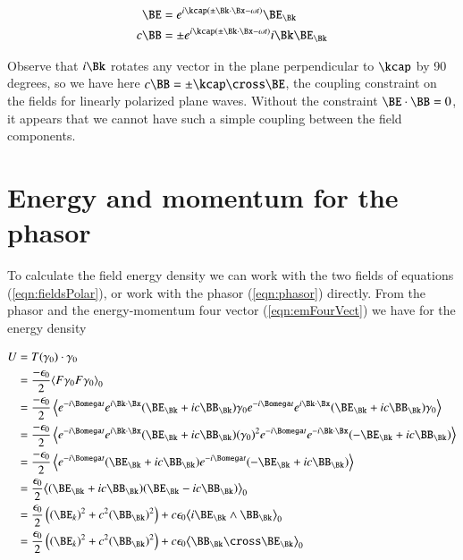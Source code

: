 \begin{align}
\BE &= e^{i \kcap( \pm \Bk \cdot \Bx -\omega t )} \BE_\Bk \\
c \BB &= \pm e^{i \kcap( \pm \Bk \cdot \Bx -\omega t )} i \Bk \BE_\Bk
\end{align}

Observe that $i\Bk$ rotates any vector in the plane perpendicular to $\kcap$ by 90 degrees, so we have here $c \BB = \pm \kcap \cross \BE$, the coupling constraint on the fields for linearly polarized plane waves.  Without the constraint $\BE \cdot \BB = 0$, it appears that we cannot have such a simple coupling between the field components.

\section{Energy and momentum for the phasor}

To calculate the field energy density we can work with the two fields of equations (\ref{eqn:fieldsPolar}), or work with the phasor (\ref{eqn:phasor}) directly.  From the phasor and the energy-momentum four vector (\ref{eqn:emFourVect}) we have for the energy density 

\begin{align*}
U &= T(\gamma_0) \cdot \gamma_0 \\
&= \frac{-\epsilon_0}{2}\gpgradezero{ F \gamma_0 F \gamma_0 } \\
&= \frac{-\epsilon_0}{2}
\left\langle{
e^{-i\Bomega t} e^{i \Bk \cdot \Bx} (\BE_\Bk + i c \BB_\Bk) \gamma_0 e^{-i\Bomega t} e^{i \Bk \cdot \Bx} (\BE_\Bk + i c \BB_\Bk) \gamma_0 
}\right\rangle \\
&= \frac{-\epsilon_0}{2}
\left\langle{
e^{-i\Bomega t} e^{i \Bk \cdot \Bx} (\BE_\Bk + i c \BB_\Bk) (\gamma_0)^2 e^{-i\Bomega t} e^{-i \Bk \cdot \Bx} (-\BE_\Bk + i c \BB_\Bk) 
}\right\rangle \\
&= \frac{-\epsilon_0}{2}
\left\langle{
e^{-i\Bomega t} (\BE_\Bk + i c \BB_\Bk) e^{-i\Bomega t} (-\BE_\Bk + i c \BB_\Bk) 
}\right\rangle \\
&= \frac{\epsilon_0}{2}\gpgradezero{ (\BE_\Bk + i c \BB_\Bk) (\BE_\Bk - i c \BB_\Bk) } \\
&= 
\frac{\epsilon_0}{2} \left( (\BE_k)^2 + c^2 (\BB_\Bk)^2\right) + {c \epsilon_0} \gpgradezero{ i \BE_\Bk \wedge \BB_\Bk } \\
&= 
\frac{\epsilon_0}{2} \left( (\BE_k)^2 + c^2 (\BB_\Bk)^2\right) + {c \epsilon_0} \gpgradezero{ \BB_\Bk \cross \BE_\Bk } \\
\end{align*}

